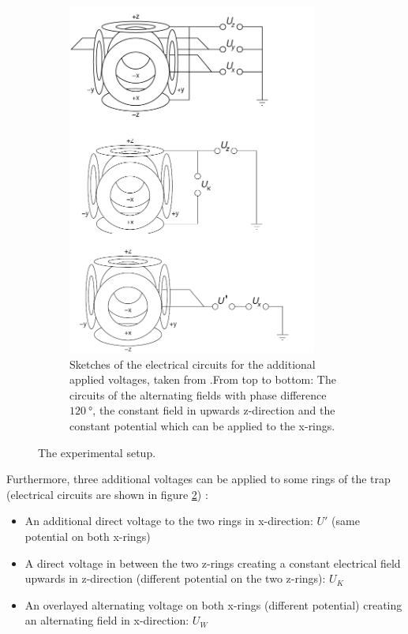 \documentclass[
	paper=A4,
	parskip=full,
	chapterprefix=true,
	11pt,
	headings=normal,
	bibliography=totoc,
	listof=totoc,
	titlepage=on,
]{scrreprt}
\begin{document}
\begin{figure}
\begin{subfigure}[t]{0.4\textwidth}
		\includegraphics[width=0.9\textwidth]{Circuits}
		\caption{Sketches of the electrical circuits for the additional applied voltages, taken from \cite{Lab_manual}.From top to bottom: The circuits of the alternating fields with phase difference $\SI{120}{\degree}$, the constant field in upwards z-direction and the constant potential which can be applied to the x-rings.}
		\label{fig:circuits}
	\end{subfigure}
\caption{The experimental setup.}
\end{figure}

Furthermore, three additional voltages can be applied to some rings of the trap (electrical circuits are shown in figure \ref{fig:circuits}) : 
\begin{itemize}
	\item An additional direct voltage to the two rings in x-direction: $U'$ (same potential on both x-rings)
	\item A direct voltage in between the two z-rings creating a constant electrical field upwards in z-direction (different potential on the two z-rings): $U_K$
	\item An overlayed alternating voltage on both x-rings (different potential) creating an alternating field in x-direction: $U_W$
\end{itemize}
\end{document}
